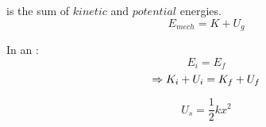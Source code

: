         \par {} is the sum of $kinetic$ and $potential$ energies.
        \begin{equation}
            E_{mech} = K + U_{g}
        \end{equation}

        \par In an :
        \begin{equation*}
            E_{i} = E_{f}
        \end{equation*}
        \begin{equation}
            \Rightarrow K_{i} + U_{i} = K_{f} + U_{f} 
        \end{equation}

        \begin{equation}
            U_{s} = \dfrac{1}{2}kx^{2}
        \end{equation}